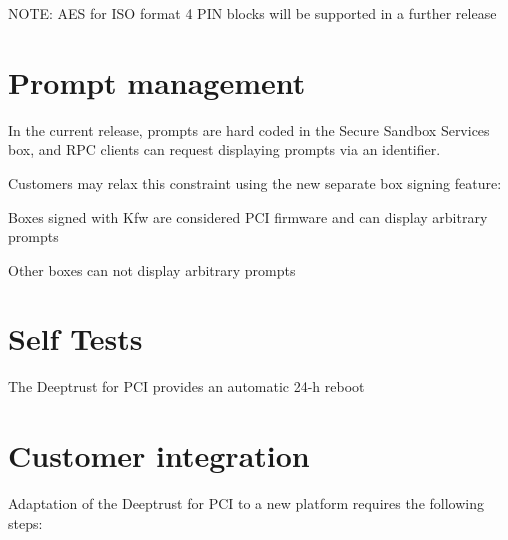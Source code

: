 N\+O\+TE\+: A\+ES for I\+SO format 4 P\+IN blocks will be supported in a further release\hypertarget{_p_c_i_g_u_i_d_a_n_c_e_sect_Prompt}{}\section{Prompt management}\label{_p_c_i_g_u_i_d_a_n_c_e_sect_Prompt}
In the current release, prompts are hard coded in the Secure Sandbox Services box, and R\+PC clients can request displaying prompts via an identifier.

Customers may relax this constraint using the new separate box signing feature\+:
\begin{DoxyItemize}
\item Boxes signed with Kfw are considered P\+CI firmware and can display arbitrary prompts
\item Other boxes can not display arbitrary prompts
\end{DoxyItemize}\hypertarget{_p_c_i_g_u_i_d_a_n_c_e_sect_SelfTest}{}\section{Self Tests}\label{_p_c_i_g_u_i_d_a_n_c_e_sect_SelfTest}
The Deeptrust for P\+CI provides an automatic 24-\/h reboot\hypertarget{_p_c_i_g_u_i_d_a_n_c_e_sect_integ}{}\section{Customer integration}\label{_p_c_i_g_u_i_d_a_n_c_e_sect_integ}
Adaptation of the Deeptrust for P\+CI to a new platform requires the following steps\+:


